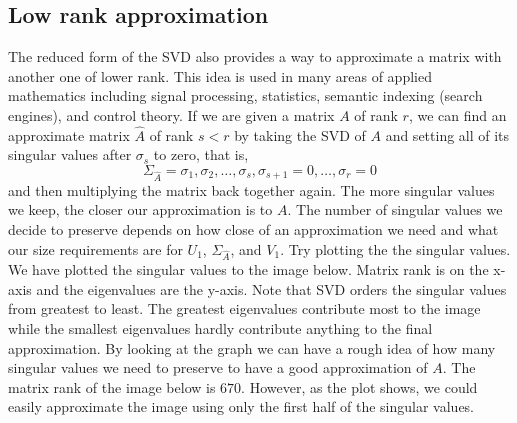 \subsection*{Low rank approximation}
The reduced form of the SVD also provides a way to approximate a
matrix with another one of lower rank. This idea is used in many areas of applied
mathematics including signal processing, statistics, semantic
indexing (search engines), and control theory.  If we are given a matrix $A$ of rank $r$,
we can find an approximate matrix $\widehat A$ of rank $s<r$ by taking
the SVD of $A$ and setting all of its singular values after
$\sigma_s$ to zero, that is,
\begin{equation*}
\Sigma_{\widehat A} = \sigma_1, \sigma_2, \ldots, \sigma_s,\sigma_{s+1}=0,\ldots,\sigma_r=0
\end{equation*}
and then multiplying the matrix back together again.  The more singular values we keep, the closer our approximation is to $A$.
  The number of singular values we decide to preserve depends on how close of an approximation we need and what our size requirements are for $U_1$, $\Sigma_{\widehat A}$, and $V_1$.
Try plotting the the singular values.  We have plotted the singular values to the image below.  Matrix rank is on the x-axis and the eigenvalues are the y-axis.  Note that SVD orders the singular values from greatest to least.  The greatest eigenvalues contribute most to the image while the smallest eigenvalues hardly contribute anything to the final approximation.  By looking at the graph we can have a rough idea of how many singular values we need to preserve to have a good approximation of $A$.  The matrix rank of the image below is $670$.  However, as the plot shows, we could easily approximate the image using only the first half of the singular values.


